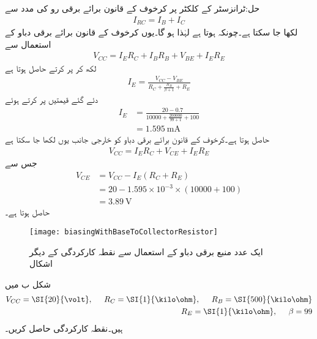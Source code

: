 حل:ٹرانزسٹر کے کلکٹر  پر کرخوف کے قانون برائے برقی رو کی مدد سے
\begin{align*}
I_{RC}=I_B+I_C
\end{align*}
لکھا جا سکتا ہے۔چونکہ  ہوتا ہے لہٰذا  ہو گا۔یوں کرخوف کے قانون برائے برقی دباو کے استعمال سے
\begin{align*}
V_{CC}=I_{E} R_C+I_B R_B +V_{BE}+I_E R_E 
\end{align*}
لکھ کر  پر کرتے حاصل ہوتا ہے
\begin{align*}
I_E=\frac{V_{CC}-V_{BE}}{R_C+\frac{R_B}{\beta+1}+R_E}
\end{align*}
دئے گئے قیمتیں پر کرتے ہوئے
\begin{align*}
I_E&=\frac{20-0.7}{10000+\frac{200000}{99+1}+100}\\
&=\SI{1.595}{\milli \ampere}
\end{align*}
حاصل ہوتا ہے۔کرخوف کے قانون برائے برقی دباو کو خارجی جانب یوں لکھا جا سکتا ہے
\begin{align*}
V_{CC}=I_E R_C+V_{CE}+I_E R_E
\end{align*}
جس سے
\begin{align*}
V_{CE}&=V_{CC}-I_E \left(R_C+R_E \right)\\
&=20-1.595 \times 10^{-3} \times \left (10000+100 \right)\\
&=\SI{3.89}{\volt}
\end{align*}
حاصل ہوتا ہے۔
%
\begin{figure}
\centering
\texttt{[image: biasingWithBaseToCollectorResistor]}
\caption{ایک عدد منبع برقی دباو کے استعمال سے نقطہ کارکردگی کے دیگر  اشکال}
\label{شکل_ایک_منبع_سے_نکتہ_کارکردگی_کا_حصول}
\end{figure}
شکل  ب میں 
\begin{align*}
V_{CC}=\SI{20}{\volt}, \hspace{5mm} R_C=\SI{1}{\kilo \ohm}, \hspace{5mm} R_B=\SI{500}{\kilo \ohm}\\
R_E=\SI{1}{\kilo \ohm}, \hspace{5mm} \beta=99
\end{align*}
ہیں۔نقطہ کارکردگی حاصل کریں۔

